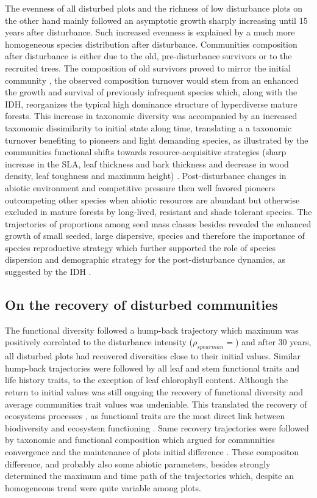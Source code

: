 \documentclass[fleqn,10pt]{ArtEcoFoG} %
\theoremstyle{definition}
\theoremstyle{definition}
\theoremstyle{definition}
\theoremstyle{remark}
\begin{document}
The evenness of all disturbed plots and the richness of low disturbance
plots on the other hand mainly followed an asymptotic growth sharply
increasing until 15 years after disturbance. Such increased evenness is
explained by a much more homogeneous species distribution after
disturbance. Communities composition after disturbance is either due to
the old, pre-disturbance survivors or to the recruited trees. The
composition of old survivors proved to mirror the initial community
\citep{Herault2018}, the observed composition turnover would stem from
an enhanced the growth and survival of previously infrequent species
which, along with the IDH, reorganizes the typical high dominance
structure of hyperdiverse mature forests. This increase in taxonomic
diversity was accompanied by an increased taxonomic dissimilarity to
initial state along time, translating a a taxonomic turnover benefiting
to pioneers and light demanding species, as illustrated by the
communities functional shifts towards resource-acquisitive strategies
(sharp increase in the SLA, leaf thickness and bark thickness and
decrease in wood density, leaf toughness and maximum height)
\citep{Westoby1998, Wright2004, Reich2014}. Post-disturbance changes in
abiotic environment and competitive pressure then well favored pioneers
outcompeting other species when abiotic resources are abundant but
otherwise excluded in mature forests by long-lived, resistant and shade
tolerant species. The trajectories of proportions among seed mass
classes besides revealed the enhanced growth of small seeded, large
dispersive, species and therefore the importance of species reproductive
strategy which further supported the role of species dispersion and
demographic strategy for the post-disturbance dynamics, as suggested by
the IDH \citep{TerSteege2001, Flores2006, Haddad2008}.

\subsection{On the recovery of disturbed
communities}\label{on-the-recovery-of-disturbed-communities}

The functional diversity followed a hump-back trajectory which maximum
was positively correlated to the disturbance intensity
(\(\rho_{spearman}=\)) and after 30 years, all disturbed plots had
recovered diversities close to their initial values. Similar hump-back
trajectories were followed by all leaf and stem functional traits and
life history traits, to the exception of leaf chlorophyll content.
Although the return to initial values was still ongoing the recovery of
functional diversity and average communities trait values was
undeniable. This translated the recovery of ecosystems processes
\citep{Guariguata2001}, as functional traits are the most direct link
between biodiversity and ecosystem functioning \citep{Diaz2005}. Same
recovery trajectories were followed by taxonomic and functional
composition which argued for communities convergence and the maintenance
of plots initial difference
\citep{Hubbell1999, Molino2001, Baraloto2012a}. These compositon
difference, and probably also some abiotic parameters, besides strongly
determined the maximum and time path of the trajectories which, despite
an homogeneous trend were quite variable among plots.
\end{document}
